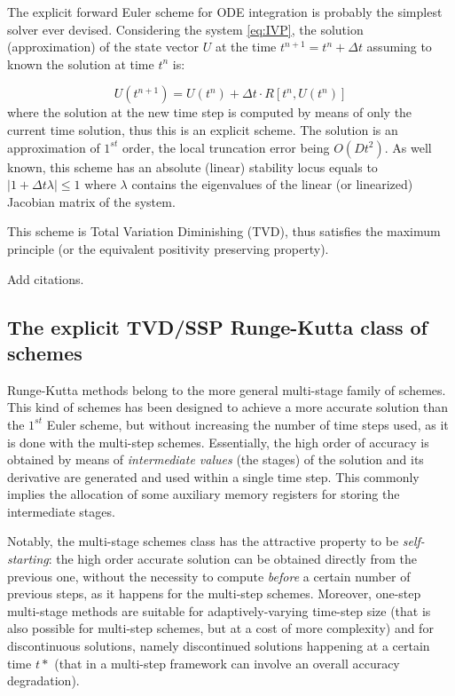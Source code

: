 The explicit forward Euler scheme for ODE integration is probably the simplest solver ever devised. Considering the system \ref{eq:IVP}, the solution (approximation) of the state vector $U$ at the time $t^{n+1}=t^n+\Delta t$ assuming to known the solution at time $t^n$ is:

\begin{equation}
  U\left(t^{n+1}\right) = U\left(t^n\right) +\Delta t \cdot R\left[t^n, U\left(t^n\right)\right]
\label{eq:solver-euler}
\end{equation}
where the solution at the new time step is computed by means of only the current time solution, thus this is an explicit scheme. The solution is an approximation of $1^{st}$ order, the local truncation error being $O(Dt^2)$. As well known, this scheme has an absolute (linear) stability locus equals to $|1+\Delta t \lambda|\le 1$ where $\lambda$ contains the eigenvalues of the linear (or linearized) Jacobian matrix of the system.

This scheme is Total Variation Diminishing (TVD), thus satisfies the maximum principle (or the equivalent positivity preserving property).

{\color{red} Add citations.}

\subsection{The explicit TVD/SSP Runge-Kutta class of schemes}

Runge-Kutta methods belong to the more general multi-stage family of schemes. This kind of schemes has been designed to achieve a more accurate solution than the $1^{st}$ Euler scheme, but without increasing the number of time steps used, as it is done with the multi-step schemes. Essentially, the high order of accuracy is obtained by means of \emph{intermediate values} (the stages) of the solution and its derivative are generated and used within a single time step. This commonly implies the allocation of some auxiliary memory registers for storing the intermediate stages.

Notably, the multi-stage schemes class has the attractive property to be \emph{self-starting}: the high order accurate solution can be obtained directly from the previous one, without the necessity to compute \emph{before} a certain number of previous steps, as it happens for the multi-step schemes. Moreover, one-step multi-stage methods are suitable for adaptively-varying time-step size (that is also possible for multi-step schemes, but at a cost of more complexity) and for discontinuous solutions, namely discontinued solutions happening at a certain time $t*$ (that in a multi-step framework can involve an overall accuracy degradation).

